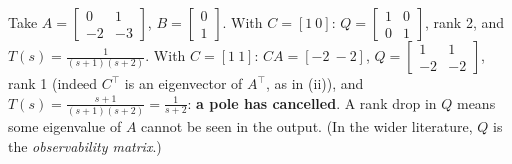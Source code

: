 \begin{exambox}[title={Why the rank matters (insight)}]
Take $A=\begin{bmatrix}0&1\\-2&-3\end{bmatrix}$, $B=\begin{bmatrix}0\\1\end{bmatrix}$. With $C=[1\ 0]$: $Q=\begin{bmatrix}1&0\\0&1\end{bmatrix}$, rank 2, and $T(s)=\frac1{(s+1)(s+2)}$.
With $C=[1\ 1]$: $CA=[-2\ -2]$, $Q=\begin{bmatrix}1&1\\-2&-2\end{bmatrix}$, rank 1 (indeed $C^\top$ is an eigenvector of $A^\top$, as in (ii)), and
$T(s)=\frac{s+1}{(s+1)(s+2)}=\frac1{s+2}$: \textbf{a pole has cancelled}. A rank drop in $Q$ means some eigenvalue of $A$ cannot be seen in the output.
(In the wider literature, $Q$ is the \emph{observability matrix}.)
\end{exambox}

